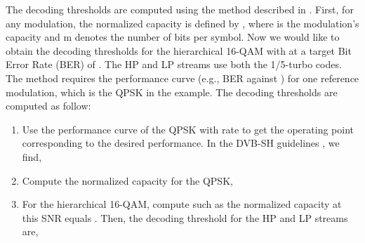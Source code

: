 \documentclass[conference, letterpaper]{IEEEtran}
\begin{document}
The decoding thresholds are computed using the method described in \cite{wts}. First, for any modulation, the normalized capacity is defined by , where   is the modulation's capacity and m denotes the number of bits per symbol. Now we would like to obtain the decoding thresholds for the hierarchical 16-QAM with  at a target Bit Error Rate (BER) of . The HP and LP streams use both the 1/5-turbo codes. The method requires the performance curve (e.g., BER against ) for one reference modulation, which is the QPSK in the example. The decoding thresholds are computed as follow:
\begin{enumerate}

\item Use the performance curve of the QPSK with rate  to get the operating point  corresponding to the desired performance. In the DVB-SH guidelines \cite[Table 7.5]{sh}, we find,


\item Compute the normalized capacity  for the QPSK,



\item For the hierarchical 16-QAM, compute  such as the normalized capacity at this SNR equals . Then, the decoding threshold for the HP and LP streams are,

\end{enumerate}
 












\nocite{*}


\end{document}
